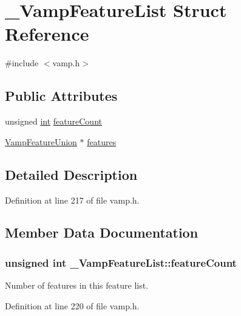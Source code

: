 \hypertarget{struct___vamp_feature_list}{}\section{\+\_\+\+Vamp\+Feature\+List Struct Reference}
\label{struct___vamp_feature_list}


{\ttfamily \#include $<$vamp.\+h$>$}

\subsection*{Public Attributes}
\begin{DoxyCompactItemize}
\item 
unsigned \hyperlink{xmltok_8h_a5a0d4a5641ce434f1d23533f2b2e6653}{int} \hyperlink{struct___vamp_feature_list_a01db33a31ae5e04a4bd097f4b6aa75f1}{feature\+Count}
\item 
\hyperlink{vamp_8h_a2517349f1c97e0c59faab6085e092fcd}{Vamp\+Feature\+Union} $\ast$ \hyperlink{struct___vamp_feature_list_a103c817094643ac5ff4410768f4f92a7}{features}
\end{DoxyCompactItemize}


\subsection{Detailed Description}


Definition at line 217 of file vamp.\+h.



\subsection{Member Data Documentation}
\subsubsection[{\texorpdfstring{feature\+Count}{featureCount}}]{\setlength{\rightskip}{0pt plus 5cm}unsigned {\bf int} \+\_\+\+Vamp\+Feature\+List\+::feature\+Count}\hypertarget{struct___vamp_feature_list_a01db33a31ae5e04a4bd097f4b6aa75f1}{}\label{struct___vamp_feature_list_a01db33a31ae5e04a4bd097f4b6aa75f1}
Number of features in this feature list. 

Definition at line 220 of file vamp.\+h.

